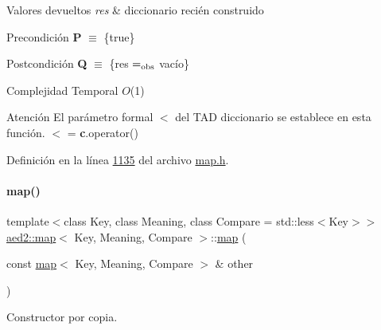 \begin{DoxyRetVals}{Valores devueltos}
{\em res} & diccionario recién construido\\
\hline
\end{DoxyRetVals}
\begin{DoxyPrecond}{Precondición}
{\bfseries P} $\equiv$ \{true\} 
\end{DoxyPrecond}
\begin{DoxyPostcond}{Postcondición}
{\bfseries Q} $\equiv$ \{res $=_{\rm obs}$ vacío\}
\end{DoxyPostcond}

\begin{DoxyDescription}
\item[Complejidad Temporal]$O$(1)
\end{DoxyDescription}

\begin{DoxyAttention}{Atención}
El parámetro formal $<$ del T\+AD diccionario se establece en esta función. $<$ = {\bfseries c}.operator() 
\end{DoxyAttention}


Definición en la línea \hyperlink{map_8h_source_l01135}{1135} del archivo \hyperlink{map_8h_source}{map.\+h}.

\mbox{\label{classaed2_1_1map_a7a77950a3d8e637bfa7cf5dcd904f257_a7a77950a3d8e637bfa7cf5dcd904f257}} 
\paragraph{\texorpdfstring{map()}{map()}\hspace{0.1cm}{\footnotesize\ttfamily [2/3]}}
{\footnotesize\ttfamily template$<$class Key, class Meaning, class Compare = std\+::less$<$\+Key$>$$>$ \\
\hyperlink{classaed2_1_1map}{aed2\+::map}$<$ Key, Meaning, Compare $>$\+::\hyperlink{classaed2_1_1map}{map} (\begin{DoxyParamCaption}\item[{const \hyperlink{classaed2_1_1map}{map}$<$ Key, Meaning, Compare $>$ \&}]{other }\end{DoxyParamCaption})\hspace{0.3cm}{\ttfamily [inline]}}



Constructor por copia. 


